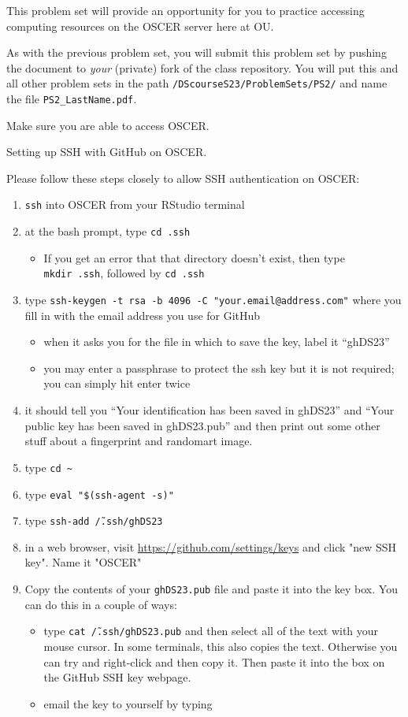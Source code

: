 \documentclass[12pt,english]{exam}
\begin{document}
This problem set will provide an opportunity for you to practice accessing computing resources on the OSCER server here at OU.

As with the previous problem set, you will submit this problem set by pushing the document to \emph{your} (private) fork of the class repository. You will put this and all other problem sets in the path \texttt{/DScourseS23/ProblemSets/PS2/} and name the file \texttt{PS2\_LastName.pdf}.
\begin{questions}
\question Make sure you are able to access OSCER.

\question Setting up SSH with GitHub on OSCER.

Please follow these steps closely to allow SSH authentication on OSCER:

\begin{enumerate}
    \item \texttt{ssh} into OSCER from your RStudio terminal
    \item at the bash prompt, type \texttt{cd\ .ssh}
    \begin{itemize}
        \item If you get an error that that directory doesn't exist, then type \texttt{mkdir\ .ssh}, followed by \texttt{cd\ .ssh} 
    \end{itemize}
    \item type \texttt{ssh-keygen -t rsa -b 4096 -C "your.email@address.com"} where you fill in with the email address you use for GitHub
    \begin{itemize}
        \item when it asks you for the file in which to save the key, label it ``ghDS23''
        \item you may enter a passphrase to protect the ssh key but it is not required; you can simply hit enter twice
    \end{itemize}
    \item it should tell you ``Your identification has been saved in ghDS23'' and ``Your public key has been saved in ghDS23.pub'' and then print out some other stuff about a fingerprint and randomart image.
    \item type \texttt{cd \~}
    \item type \texttt{eval "\$(ssh-agent -s)"}
    \item type \texttt{ssh-add \~/.ssh/ghDS23}
    \item in a web browser, visit \url{https://github.com/settings/keys} and click "new SSH key". Name it "OSCER"
    \item Copy the contents of your \texttt{ghDS23.pub} file and paste it into the key box. You can do this in a couple of ways:
    \begin{itemize}
        \item type \texttt{cat \~/.ssh/ghDS23.pub} and then select all of the text with your mouse cursor. In some terminals, this also copies the text. Otherwise you can try and right-click and then copy it. Then paste it into the box on the GitHub SSH key webpage.
        \item email the key to yourself by typing
        

\end{itemize}
\end{enumerate}
\end{questions}
\end{document}
